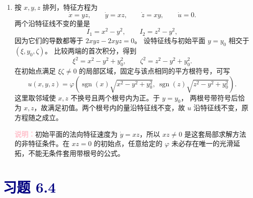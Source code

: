 \documentclass[UTF8,a4paper,11pt]{ctexart}
\newcommand{\note}[1]{\par\smallskip\noindent\textcolor{pink}{\bfseries 说明：}#1\par\smallskip}
\newcommand{\sect}[1]{\section*{\textcolor{navy}{习题 #1}}}
\begin{document}
\begin{solution}
\begin{enumerate}[label=(\arabic*)]
\item 按 $x,y,z$ 排列，特征方程为
\[
\dot x=yz,\qquad \dot y=xz,\qquad
\dot z=xy,\qquad \dot u=0.
\]
两个沿特征线不变的量是
\[
I_1=x^2-y^2,\qquad I_2=z^2-y^2,
\]
因为它们的导数都等于 $2xyz-2xyz=0$。
设特征线与初始平面 $y=y_0$ 相交于 $(\xi,y_0,\zeta)$。
比较两端的首次积分，得到
\[
\xi^2=x^2-y^2+y_0^2,\qquad
\zeta^2=z^2-y^2+y_0^2.
\]
在初始点满足 $\xi\zeta\ne0$ 的局部区域，固定与该点相同的平方根符号，可写
\[
\boxed{
u(x,y,z)=\varphi\!\left(
\operatorname{sgn}(x)\sqrt{x^2-y^2+y_0^2},\
\operatorname{sgn}(z)\sqrt{z^2-y^2+y_0^2}
\right).}
\]
这里取邻域使 $x,z$ 不换号且两个根号内为正。于 $y=y_0$，
两根号带符号后恰为 $x,z$，故满足初值。两个根号内的量沿特征线不变，故 $u$ 沿特征线不变，原方程随之成立。
\note{初始平面的法向特征速度为 $\dot y=xz$，所以 $xz\ne0$ 是这套局部求解方法的非特征条件。在 $xz=0$ 的初始点，任意给定的 $\varphi$ 未必存在唯一的光滑延拓，不能无条件套用带根号的公式。}
\end{enumerate}
\end{solution}

\sect{6.4}
\end{document}
